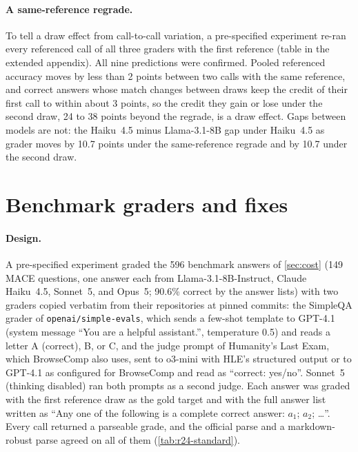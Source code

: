 \begin{table}[htbp]
\centering
\caption{The benchmark study under a second reference draw: pooled referenced minus answer-list accuracy under each draw and its change (points, 95\% CI, question bootstrap), and the share of correct answers credited (score 7 or above) among those that stop or start matching the reference between draws. Opus~5 uses the 136 questions with both draws complete.\pre}
\label{tab:r22-redraw}
\footnotesize
\setlength{\tabcolsep}{3pt}

\end{table}

\paragraph{A same-reference regrade.}
To tell a draw effect from call-to-call variation, a pre-specified experiment re-ran every referenced call of all three graders with the first reference (table in the extended appendix). All nine predictions were confirmed. Pooled referenced accuracy moves by less than 2 points between two calls with the same reference, and correct answers whose match changes between draws keep the credit of their first call to within about 3 points, so the credit they gain or lose under the second draw, 24 to 38 points beyond the regrade, is a draw effect. Gaps between models are not: the Haiku~4.5 minus Llama-3.1-8B gap under Haiku~4.5 as grader moves by 10.7 points under the same-reference regrade and by 10.7 under the second draw.
\FloatBarrier
\section{Benchmark graders and fixes}
\label{app:r24}

\paragraph{Design.} A pre-specified experiment graded the 596 benchmark answers of \cref{sec:cost} (149 \textsc{MACE} questions, one answer each from Llama-3.1-8B-Instruct, Claude Haiku~4.5, Sonnet~5, and Opus~5; 90.6\% correct by the answer lists) with two graders copied verbatim from their repositories at pinned commits: the SimpleQA grader of \texttt{openai/simple-evals}, which sends a few-shot template to GPT-4.1 (system message ``You are a helpful assistant.'', temperature 0.5) and reads a letter A (correct), B, or C, and the judge prompt of Humanity's Last Exam, which BrowseComp also uses, sent to o3-mini with HLE's structured output or to GPT-4.1 as configured for BrowseComp and read as ``correct: yes/no''. Sonnet~5 (thinking disabled) ran both prompts as a second judge. Each answer was graded with the first reference draw as the gold target and with the full answer list written as ``Any one of the following is a complete correct answer: $a_1$; $a_2$; \dots''. Every call returned a parseable grade, and the official parse and a markdown-robust parse agreed on all of them (\cref{tab:r24-standard}).

